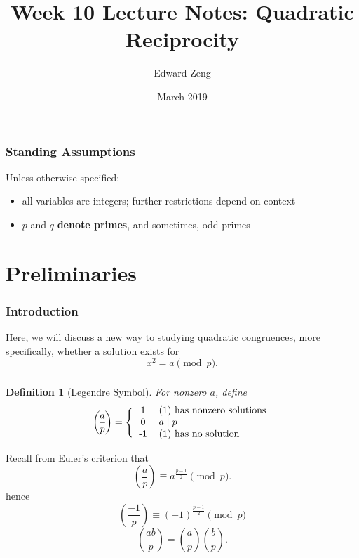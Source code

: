 \documentclass{article}
\title{Week 10 Lecture Notes: Quadratic Reciprocity}
\author{Edward Zeng}
\date{March 2019}
\newtheorem{definition}{Definition}
\newcommand{\legendre}[2]{\genfrac{(}{)}{}{}{#1}{#2}}
\begin{document}
\maketitle
\subsubsection{Standing Assumptions}
Unless otherwise specified:
\begin{itemize}
    \item all variables are integers; further restrictions depend on context
    \item $p$ and $q$ \textbf{denote primes}, and sometimes, odd primes
\end{itemize}

\section{Preliminaries}
\subsubsection{Introduction}
Here, we will discuss a new way to studying quadratic congruences, more specifically, whether a solution exists for
\begin{equation}
    x^{2} = a \pmod{p}.
\end{equation}

\subsubsection{}
\begin{definition}[Legendre Symbol]
    For nonzero $a$, define
    \begin{equation}
   \legendre{a}{p} = \Bigg\{
  \begin{tabular}{cl}
  1 & \textrm{(1) has nonzero solutions} \\
  0 & $a \mid p$ \\
  -1 & \textrm{(1) has no solution}
  \end{tabular}
\end{equation}
\end{definition}
Recall from Euler's criterion that
\begin{equation}
    \legendre{a}{p} \equiv a^{\frac{p-1}{2}} \pmod{p}.
\end{equation}
hence
\begin{equation}
    \legendre{-1}{p} \equiv (-1)^{\frac{p-1}{2}} \pmod{p}
\end{equation}
\begin{equation}
    \legendre{ab}{p} = \legendre{a}{p}\legendre{b}{p}.
\end{equation}
\end{document}
